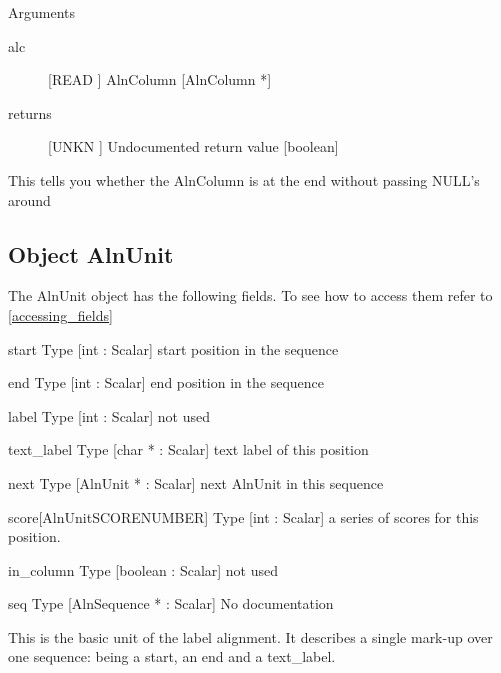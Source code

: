 Arguments
\begin{description}
\item[alc] [READ ] AlnColumn [AlnColumn *]
\item[returns] [UNKN ] Undocumented return value [boolean]
\end{description}
This tells you whether the AlnColumn is at the
end without passing NULL's around




\subsection{Object AlnUnit}

\label{object_AlnUnit}

The AlnUnit object has the following fields. To see how to access them refer to \ref{accessing_fields}
\begin{description}
\item{start} Type [int : Scalar]  start position in the sequence

\item{end} Type [int : Scalar]  end position in the sequence

\item{label} Type [int : Scalar]  not used

\item{text_label} Type [char * : Scalar]  text label of this position

\item{next} Type [AlnUnit * : Scalar]  next AlnUnit in this sequence

\item{score[AlnUnitSCORENUMBER]} Type [int : Scalar]  a series of scores for this position.

\item{in_column} Type [boolean : Scalar]  not used 

\item{seq} Type [AlnSequence * : Scalar] No documentation

\end{description}
This is the basic unit of the label alignment.
It describes a single mark-up over one sequence:
being a start, an end and a text_label.




